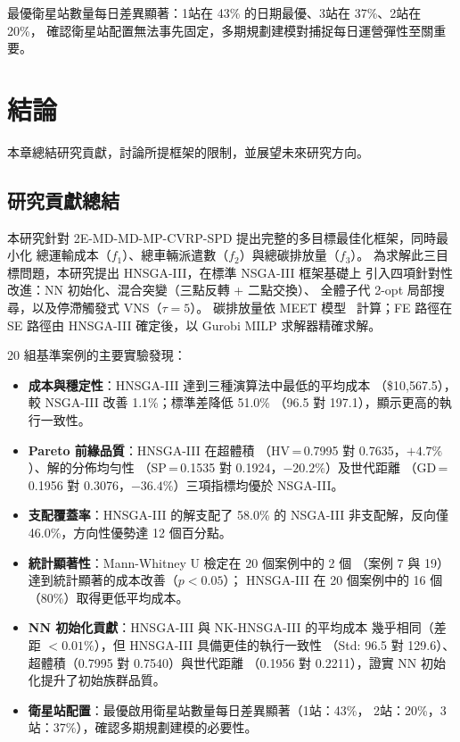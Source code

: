 \documentclass[11pt, a4paper]{article}
\numberwithin{equation}{section}
\begin{document}
最優衛星站數量每日差異顯著：1站在 43\% 的日期最優、3站在 37\%、2站在 20\%，
確認衛星站配置無法事先固定，多期規劃建模對捕捉每日運營彈性至關重要。

\section{結論}
\label{sec:conc}

本章總結研究貢獻，討論所提框架的限制，並展望未來研究方向。

\subsection{研究貢獻總結}

本研究針對 2E-MD-MD-MP-CVRP-SPD 提出完整的多目標最佳化框架，同時最小化
總運輸成本（$f_1$）、總車輛派遣數（$f_2$）與總碳排放量（$f_3$）。
為求解此三目標問題，本研究提出 HNSGA-III，在標準 NSGA-III 框架基礎上
引入四項針對性改進：NN 初始化、混合突變（三點反轉 + 二點交換）、
全體子代 2-opt 局部搜尋，以及停滯觸發式 VNS（$\tau=5$）。
碳排放量依 MEET 模型~\cite{hickman1999} 計算；FE 路徑在 SE 路徑由 HNSGA-III
確定後，以 Gurobi MILP 求解器精確求解。

20 組基準案例的主要實驗發現：
\begin{itemize}
  \item \textbf{成本與穩定性}：HNSGA-III 達到三種演算法中最低的平均成本
        （\$10{,}567.5），較 NSGA-III 改善 1.1\%；標準差降低 51.0\%
        （96.5 對 197.1），顯示更高的執行一致性。
  \item \textbf{Pareto 前緣品質}：HNSGA-III 在超體積
        （HV\,=\,0.7995 對 0.7635，$+4.7\%$）、解的分佈均勻性
        （SP\,=\,0.1535 對 0.1924，$-20.2\%$）及世代距離
        （GD\,=\,0.1956 對 0.3076，$-36.4\%$）三項指標均優於 NSGA-III。
  \item \textbf{支配覆蓋率}：HNSGA-III 的解支配了 58.0\% 的 NSGA-III
        非支配解，反向僅 46.0\%，方向性優勢達 12 個百分點。
  \item \textbf{統計顯著性}：Mann-Whitney U 檢定在 20 個案例中的 2 個
        （案例 7 與 19）達到統計顯著的成本改善（$p<0.05$）；
        HNSGA-III 在 20 個案例中的 16 個（80\%）取得更低平均成本。
  \item \textbf{NN 初始化貢獻}：HNSGA-III 與 NK-HNSGA-III 的平均成本
        幾乎相同（差距 $<0.01\%$），但 HNSGA-III 具備更佳的執行一致性
        （Std: 96.5 對 129.6）、超體積（0.7995 對 0.7540）與世代距離
        （0.1956 對 0.2211），證實 NN 初始化提升了初始族群品質。
  \item \textbf{衛星站配置}：最優啟用衛星站數量每日差異顯著（1站：43\%，
        2站：20\%，3站：37\%），確認多期規劃建模的必要性。
\end{itemize}
\end{document}
